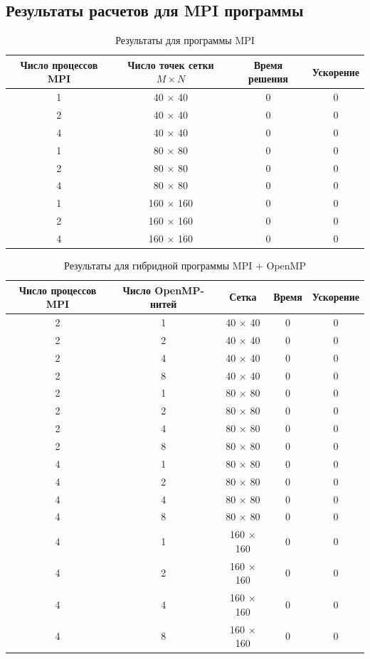 \documentclass[oneside,final,14pt]{extreport}
\begin{document}
\newpage
\subsection{Результаты расчетов для MPI программы}
\begin{table}[ht]
\begin{tabular}{|c|c|c|c|}
\hline
Число процессов MPI & Число точек сетки \(M \times N\) &
Время решения & Ускорение \\
\hline
1 & 40 \(\times\) 40 & 0 & 0 \\
2 & 40 \(\times\) 40 & 0 & 0 \\
4 & 40 \(\times\) 40 & 0 & 0 \\
\hline
1 & 80 \(\times\) 80 & 0 & 0 \\
2 & 80 \(\times\) 80 & 0 & 0 \\
4 & 80 \(\times\) 80 & 0 & 0 \\
\hline
1 & 160 \(\times\) 160 & 0 & 0 \\
2 & 160 \(\times\) 160 & 0 & 0 \\
4 & 160 \(\times\) 160 & 0 & 0 \\
\hline
\end{tabular}
\caption{Результаты для программы MPI}
\label{tab3}
\end{table}

\begin{table}[h]
\begin{tabular}{|c|c|c|c|c|}
\hline
Число процессов MPI & Число OpenMP-нитей & Сетка & Время & Ускорение \\
\hline
2 & 1 & 40 \(\times\) 40 & 0 & 0 \\
2 & 2 & 40 \(\times\) 40 & 0 & 0 \\
2 & 4 & 40 \(\times\) 40 & 0 & 0 \\
2 & 8 & 40 \(\times\) 40 & 0 & 0 \\
\hline
2 & 1 & 80 \(\times\) 80 & 0 & 0 \\
2 & 2 & 80 \(\times\) 80 & 0 & 0 \\
2 & 4 & 80 \(\times\) 80 & 0 & 0 \\
2 & 8 & 80 \(\times\) 80 & 0 & 0 \\
\hline
4 & 1 & 80 \(\times\) 80 & 0 & 0 \\
4 & 2 & 80 \(\times\) 80 & 0 & 0 \\
4 & 4 & 80 \(\times\) 80 & 0 & 0 \\
4 & 8 & 80 \(\times\) 80 & 0 & 0 \\
\hline
4 & 1 & 160 \(\times\) 160 & 0 & 0 \\
4 & 2 & 160 \(\times\) 160 & 0 & 0 \\
4 & 4 & 160 \(\times\) 160 & 0 & 0 \\
4 & 8 & 160 \(\times\) 160 & 0 & 0 \\
\hline
\end{tabular}
\caption{Результаты для гибридной программы MPI + OpenMP}
\label{tab4}
\end{table}
\end{document}
